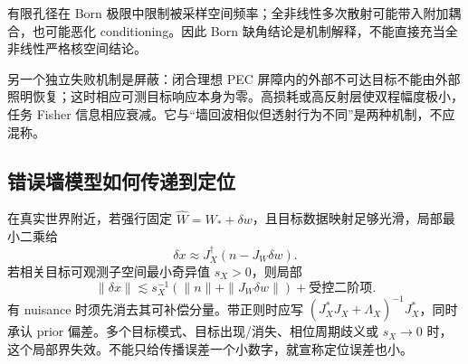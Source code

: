有限孔径在 Born 极限中限制被采样空间频率；全非线性多次散射可能带入附加耦合，也可能恶化 conditioning。因此 Born 缺角结论是机制解释，不能直接充当全非线性严格核空间结论。

另一个独立失败机制是屏蔽：闭合理想 PEC 屏障内的外部不可达目标不能由外部照明恢复；这时相应可测目标响应本身为零。高损耗或高反射层使双程幅度极小，任务 Fisher 信息相应衰减。它与“墙回波相似但透射行为不同”是两种机制，不应混称。

\subsection{错误墙模型如何传递到定位}
在真实世界附近，若强行固定 $\widehat W=W_*+\delta w$，且目标数据映射足够光滑，局部最小二乘给
\[
\delta x\approx J_X^\dagger(n-J_W\delta w).
\]
若相关目标可观测子空间最小奇异值 $s_X>0$，则局部
\[
\|\delta x\|\lesssim
s_X^{-1}\left(\|n\|+\|J_W\delta w\|\right)
+\text{受控二阶项}.
\]
有 nuisance 时须先消去其可补偿分量。带正则时应写 $(J_X^*J_X+\Lambda_X)^{-1}J_X^*$，同时承认 prior 偏差。多个目标模式、目标出现/消失、相位周期歧义或 $s_X\to0$ 时，这个局部界失效。不能只给传播误差一个小数字，就宣称定位误差也小。

